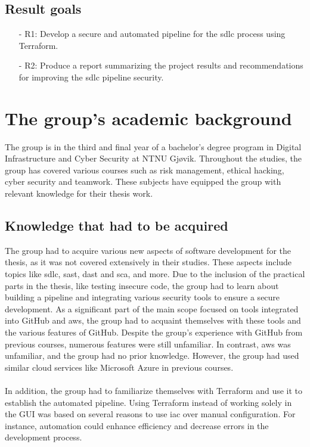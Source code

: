 \subsection{Result goals}
\begin{itemize}
    
    \item[-] R1: Develop a secure and automated pipeline for the \acrshort{sdlc} process using Terraform. 
    
    \item[-] R2: Produce a report summarizing the project results and recommendations for improving the \acrshort{sdlc} pipeline security.
    
\end{itemize}


\section{The group's academic background}
The group is in the third and final year of a bachelor's degree program in Digital Infrastructure and Cyber Security at NTNU Gjøvik. Throughout the studies, the group has covered various courses such as risk management, ethical hacking, cyber security and teamwork. These subjects have equipped the group with relevant knowledge for their thesis work.

\subsection{Knowledge that had to be acquired}
\label{section: Knowledge that had to be acquired}
The group had to acquire various new aspects of software development for the thesis, as it was not covered extensively in their studies. These aspects include topics like \acrshort{sdlc}, \acrlong{sast}, \acrlong{dast} and \acrlong{sca}, and more. Due to the inclusion of the practical parts in the thesis, like testing insecure code, the group had to learn about building a pipeline and integrating various security tools to ensure a secure development. As a significant part of the main scope focused on tools integrated into GitHub and \acrlong{aws}, the group had to acquaint themselves with these tools and the various features of GitHub. Despite the group's experience with GitHub from previous courses, numerous features were still unfamiliar. In contrast, \acrshort{aws} was unfamiliar, and the group had no prior knowledge. However, the group had used similar cloud services like Microsoft Azure in previous courses.
\\~\\
In addition, the group had to familiarize themselves with Terraform and use it to establish the automated pipeline. Using Terraform instead of working solely in the \gls{GUI} was based on several reasons to use \gls{iac} over manual configuration. For instance, automation could enhance efficiency and decrease errors in the development process.

